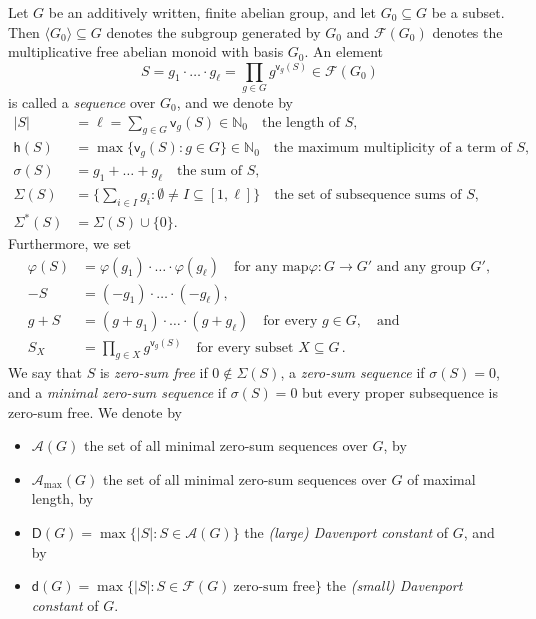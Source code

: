 \documentclass[a4paper, 10pt]{amsart}
\theoremstyle{plain}
\theoremstyle{definition}
\newcommand{\N}{\mathbb N}
\numberwithin{equation}{section}
\begin{document}
Let $G$ be an additively written, finite abelian group, and let $G_0 \subseteq G$ be a subset. Then $\langle G_0 \rangle \subseteq G$ denotes the subgroup generated by $G_0$ and $\mathcal F (G_0)$ denotes the multiplicative free abelian monoid with basis $G_0$. An element 
\[
S = g_1 \cdot \ldots \cdot g_{\ell} = \prod_{g \in G} g^{\mathsf v_g (S)} \in \mathcal F (G_0)
\]
is called a {\it sequence} over $G_0$, and we denote by
\[
\begin{aligned}
|S| & = \ell = \sum_{g \in G} \mathsf v_g (S) \in \N_0 \quad \text{the length of $S$, } \\
\mathsf h (S) & = \max \{ \mathsf v_g (S) \colon g \in G\} \in \N_0 \quad \text{the maximum multiplicity of a term of $S$, } \\
\sigma (S) & = g_1 + \ldots + g_{\ell} \quad \text{the sum of $S$,  } \\
\Sigma (S) & = \Big\{ \sum_{i \in I} g_i \colon \emptyset \ne I \subseteq [1, \ell] \Big\} \quad \text{the set of subsequence sums of $S$,} \\
\Sigma^*(S) & = \Sigma (S) \cup \{0\}.
\end{aligned}
\]
Furthermore, we set
\[
\begin{aligned}
\varphi (S) & = \varphi (g_1) \cdot \ldots \cdot \varphi (g_{\ell}) \quad  \text{for any map
$\varphi \colon G \to G'$ and any group $G'$}, \\
-S & = (-g_1) \cdot \ldots \cdot (-g_{\ell}), \\
g + S & = (g+g_1) \cdot \ldots \cdot (g+g_{\ell}) \quad  \text{for every $g \in G$}, \quad \text{and} \\
S_X & = \prod_{g \in X} g^{\mathsf v_g (S)} \quad  \text{for every subset $X \subseteq G$} \,.
\end{aligned}
\]
We say that $S$ is {\it zero-sum free} if $0 \notin \Sigma (S)$, a {\it zero-sum sequence} if $\sigma (S)=0$, and a  {\it minimal zero-sum sequence} if $\sigma (S) = 0$ but every proper subsequence is zero-sum free.  We denote by
\begin{itemize}
\item $\mathcal A (G)$ the set of all minimal zero-sum sequences over $G$, by 

\item $\mathcal A_{\max} (G)$ the set of all minimal zero-sum sequences over $G$ of maximal length,  by 


\item $\mathsf D (G) = \max \{ |S| \colon S \in \mathcal A (G) \}$ the {\it (large) Davenport constant} of $G$,  and by

    
\item $\mathsf d (G) = \max \{ |S| \colon S \in \mathcal F (G) \ \text{zero-sum free} \}$ the   {\it (small) Davenport constant} of $G$.
\end{itemize}
\end{document}
